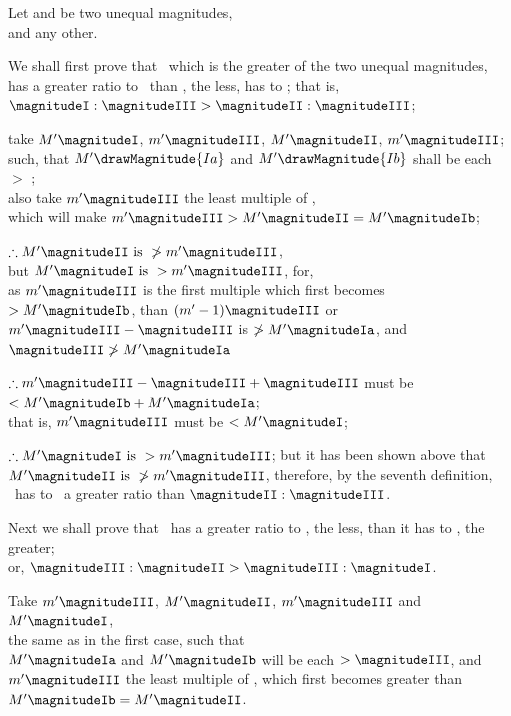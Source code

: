 \documentclass[booklanguage=english]{byrnebook}
\begin{document}
\begin{center}
Let  and  be two unequal magnitudes,\\
and  any other.
\end{center}

We shall first prove that \magnitudeI\ which is the greater of the two unequal magnitudes, has a greater ratio to \magnitudeIII\ than \magnitudeII, the less, has to \magnitudeIII; that is, $\magnitudeI : \magnitudeIII > \magnitudeII : \magnitudeIII$;

\begin{center}
take $M' \magnitudeI$, $m' \magnitudeIII$, $M' \magnitudeII$, $m' \magnitudeIII$;\\
such, that $M' \drawMagnitude{Ia}$ and $M' \drawMagnitude{Ib}$ shall be each $>$ \magnitudeIII;\\
also take $m' \magnitudeIII$ the least multiple of \magnitudeIII,\\
which will make $m' \magnitudeIII > M' \magnitudeII = M' \magnitudeIb$;

$\therefore M' \magnitudeII \mbox{ is } \ngtr m' \magnitudeIII$,\\ %
but $M' \magnitudeI \mbox{ is } > m' \magnitudeIII$, for,\\
as $m' \magnitudeIII$ is the first multiple which first becomes $> M' \magnitudeIb$, than $(m' - 1)\magnitudeIII$ or $m' \magnitudeIII - \magnitudeIII$ is $\ngtr M' \magnitudeIa$, and $\magnitudeIII \ngtr M' \magnitudeIa$ %

$\therefore m' \magnitudeIII - \magnitudeIII + \magnitudeIII$ must be $< M' \magnitudeIb + M' \magnitudeIa$;\\ %
that is, $m' \magnitudeIII$ must be $< M' \magnitudeI$;

$\therefore M' \magnitudeI \mbox{ is } > m' \magnitudeIII$; but it has been shown above that $M' \magnitudeII \mbox{ is } \ngtr m' \magnitudeIII$, therefore, by the seventh definition, \magnitudeI\ has to \magnitudeIII\ a greater ratio than $\magnitudeII : \magnitudeIII$. %

Next we shall prove that \magnitudeIII\ has a greater ratio to \magnitudeII, the less, than it has to \magnitudeI, the greater;\\
or, $\magnitudeIII : \magnitudeII > \magnitudeIII : \magnitudeI$.

Take $m' \magnitudeIII$, $M' \magnitudeII$, $m' \magnitudeIII$ and $M' \magnitudeI$,\\
the same as in the first case, such that\\
$M' \magnitudeIa$ and $M' \magnitudeIb$ will be each $> \magnitudeIII$, and $m' \magnitudeIII$ the least multiple of \magnitudeIII, which first becomes greater than $M' \magnitudeIb = M' \magnitudeII$.


\end{center}
\end{document}
